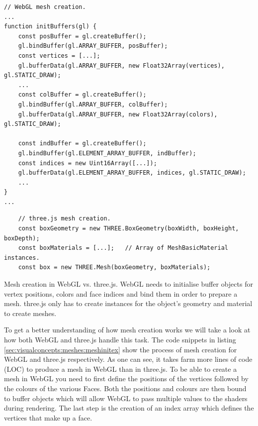 \begin{listing}[H]
\begin{verbatim}
// WebGL mesh creation.
...
function initBuffers(gl) {
	const posBuffer = gl.createBuffer();
	gl.bindBuffer(gl.ARRAY_BUFFER, posBuffer);
	const vertices = [...];
	gl.bufferData(gl.ARRAY_BUFFER, new Float32Array(vertices), gl.STATIC_DRAW);
	...
	const colBuffer = gl.createBuffer();
	gl.bindBuffer(gl.ARRAY_BUFFER, colBuffer);
	gl.bufferData(gl.ARRAY_BUFFER, new Float32Array(colors), gl.STATIC_DRAW);
	
	const indBuffer = gl.createBuffer();
   	gl.bindBuffer(gl.ELEMENT_ARRAY_BUFFER, indBuffer);
   	const indices = new Uint16Array([...]);
   	gl.bufferData(gl.ELEMENT_ARRAY_BUFFER, indices, gl.STATIC_DRAW);
   	...
}
...
\end{verbatim}
\begin{verbatim}
	// three.js mesh creation.		
	const boxGeometry = new THREE.BoxGeometry(boxWidth, boxHeight, boxDepth);
	const boxMaterials = [...];   // Array of MeshBasicMaterial instances.
	const box = new THREE.Mesh(boxGeometry, boxMaterials);
\end{verbatim}
\caption{Mesh creation in WebGL vs. three.js. WebGL needs to initialise buffer objects for vertex positions, colors and face indices and bind them in order to prepare a mesh. three.js only has to create instances for the object's geometry and material to create meshes.}
	\label{sec:visualconcepts:meshes:meshinitex}
\end{listing}

To get a better understanding of how mesh creation works we will take a look at how both WebGL and three.js handle this task. The code snippets in listing \ref{sec:visualconcepts:meshes:meshinitex} show the process of mesh creation for WebGL and three.js respectively. As one can see, it takes farm more lines of code (LOC) to produce a mesh in WebGL than in three.js. To be able to create a mesh in WebGL you need to first define the positions of the vertices followed by the colours of the various Faces. Both the positions and colours are then bound to buffer objects which will allow WebGL to pass multiple values to the shaders during rendering. The last step is the creation of an index array which defines the vertices that make up a face.

